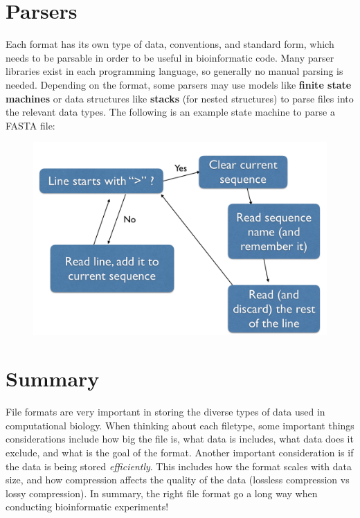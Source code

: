 \documentclass[12pt]{article}
\begin{document}
\section{Parsers}
Each format has its own type of data, conventions, and standard form, which needs to be parsable in order to be useful in bioinformatic code. Many parser libraries exist in each programming language, so generally no manual parsing is needed. Depending on the format, some parsers may use models like {\bf finite state machines} or data structures like {\bf stacks} (for nested structures) to parse files into the relevant data types. The following is an example state machine to parse a FASTA file:
\begin{figure}[h]
    \centering
    \includegraphics[width=.7\linewidth]{fasta_parse}
\end{figure}
   

\section{Summary}
File formats are very important in storing the diverse types of data used in computational biology. When thinking about each filetype, some important things considerations include how big the file is, what data is includes, what data does it exclude, and what is the goal of the format. Another important consideration is if the data is being stored {\it efficiently}. This includes how the format scales with data size, and how compression affects the quality of the data (lossless compression vs lossy compression). In summary, the right file format go a long way when conducting bioinformatic experiments!
\end{document}
